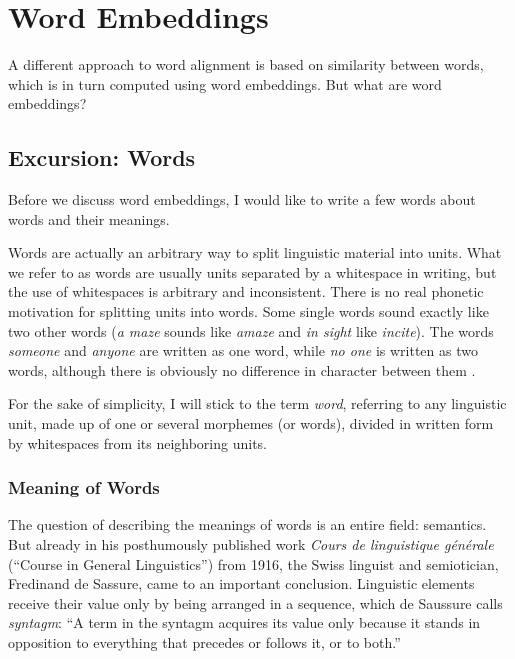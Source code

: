 


\section{Word Embeddings}
\label{sec:word-embeddings}
A different approach to word alignment is based on similarity between words, which is in turn computed using word embeddings. 
But what are word embeddings?
 

\subsection{Excursion: Words}
Before we discuss word embeddings, I would like to write a few words about words and their meanings.

Words are actually an arbitrary way to split linguistic material into units. 
What we refer to as words are usually units separated by a whitespace in writing, but the use of whitespaces is arbitrary and inconsistent. 
There is no real phonetic motivation for splitting units into words. 
Some single words sound exactly like two other words (\emph{a maze} sounds like \emph{amaze} and \emph{in sight} like \emph{incite}). 
The words \emph{someone} and \emph{anyone} are written as one word, while \emph{no one} is written as two words, although there is obviously no difference in character between them \autocite[92-95]{Jespersen1924}.

For the sake of simplicity, I will stick to the term \emph{word}, referring to any linguistic unit, made up of one or several morphemes (or words), divided in written form by whitespaces from its neighboring units.

\subsubsection{Meaning of Words}
The question of describing the meanings of words is an entire field: semantics. But already in his posthumously published work \emph{Cours de linguistique générale} (\enquote{Course in General Linguistics}) from 1916, the Swiss linguist and semiotician, Fredinand de Sassure, came to an important conclusion. 
Linguistic elements receive their value only by being arranged in a sequence, which de Saussure calls \emph{syntagm}: 
\enquote{A term in the syntagm acquires its value only because it stands in opposition to everything that precedes or follows it, or to both.} \autocite[123]{de-saussure-1959-course} 


